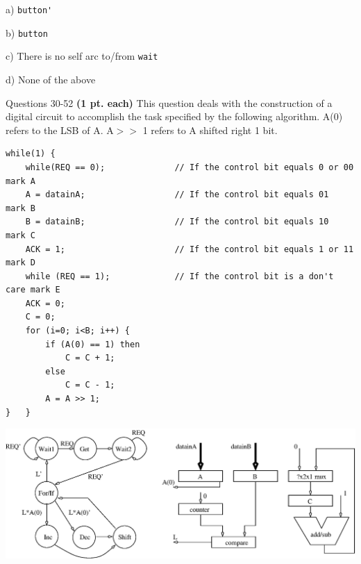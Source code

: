 \documentclass{article}
\begin{document}
\begin{enumerate}
\begin{description}
\item{a) } \verb+button'+
\item{b) } \verb+button+
\item{c) } There is no self arc to/from \verb+wait+
\item{d) } None of the above
\end{description}


\pagebreak
Questions 30-52 {\bf (1 pt. each)} This question deals with the construction 
of a digital circuit to accomplish the task specified by the following 
algorithm.  A(0) refers to the LSB of A.  A$>>$ 1 refers to A shifted right 
1 bit.

{\small
\begin{verbatim}
while(1) {
    while(REQ == 0);              // If the control bit equals 0 or 00  mark A 
    A = datainA;                  // If the control bit equals 01       mark B 
    B = datainB;                  // If the control bit equals 10       mark C 
    ACK = 1;                      // If the control bit equals 1 or 11  mark D 
    while (REQ == 1);             // If the control bit is a don't care mark E 
    ACK = 0;
    C = 0;
    for (i=0; i<B; i++) {
        if (A(0) == 1) then
            C = C + 1;
        else 
            C = C - 1;
        A = A >> 1;
}   } 
\end{verbatim}}

\scalebox{0.7} {\includegraphics{./Fig3/dp&cu.eps}}


\end{enumerate}
\end{document}
